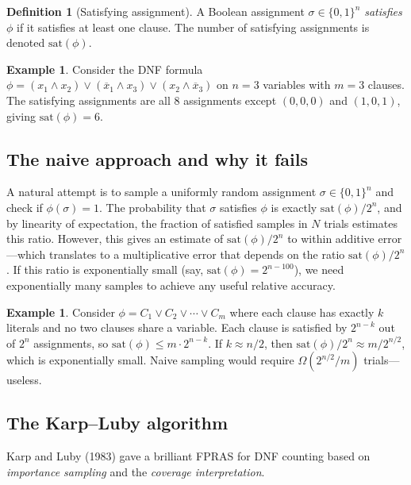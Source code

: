 \documentclass[twoside,12pt]{book}
\theoremstyle{plain}
\theoremstyle{definition}
\newtheorem{definition}[theorem]{Definition}
\newtheorem{example}[theorem]{Example}
\theoremstyle{remark}
\begin{document}
\begin{definition}[Satisfying assignment]
A Boolean assignment $\sigma \in \{0,1\}^n$ \emph{satisfies} $\phi$ if it satisfies at least one clause. The number of satisfying assignments is denoted $\text{sat}(\phi)$.
\end{definition}

\begin{example}
Consider the DNF formula $\phi = (x_1 \land x_2) \lor (\overline{x}_1 \land x_3) \lor (x_2 \land \overline{x}_3)$ on $n = 3$ variables with $m = 3$ clauses. The satisfying assignments are all 8 assignments except $(0,0,0)$ and $(1,0,1)$, giving $\text{sat}(\phi) = 6$.
\end{example}

\subsection{The naive approach and why it fails}

A natural attempt is to sample a uniformly random assignment $\sigma \in \{0,1\}^n$ and check if $\phi(\sigma) = 1$. The probability that $\sigma$ satisfies $\phi$ is exactly $\text{sat}(\phi)/2^n$, and by linearity of expectation, the fraction of satisfied samples in $N$ trials estimates this ratio. However, this gives an estimate of $\text{sat}(\phi)/2^n$ to within additive error---which translates to a multiplicative error that depends on the ratio $\text{sat}(\phi)/2^n$. If this ratio is exponentially small (say, $\text{sat}(\phi) = 2^{n-100}$), we need exponentially many samples to achieve any useful relative accuracy.

\begin{example}
Consider $\phi = C_1 \lor C_2 \lor \cdots \lor C_m$ where each clause has exactly $k$ literals and no two clauses share a variable. Each clause is satisfied by $2^{n-k}$ out of $2^n$ assignments, so $\text{sat}(\phi) \leq m \cdot 2^{n-k}$. If $k \approx n/2$, then $\text{sat}(\phi)/2^n \approx m/2^{n/2}$, which is exponentially small. Naive sampling would require $\Omega(2^{n/2}/m)$ trials---useless.
\end{example}

\subsection{The Karp--Luby algorithm}

Karp and Luby (1983) gave a brilliant FPRAS for DNF counting based on \emph{importance sampling} and the \emph{coverage interpretation}.
\end{document}
